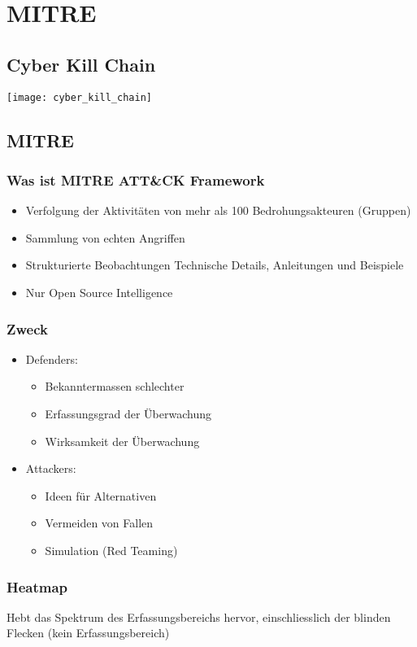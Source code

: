 

\section{MITRE}
\subsection{Cyber Kill Chain}
\begin{center}
    \texttt{[image: cyber\_kill\_chain]}
    \vspace{-8pt}
\end{center}


\subsection{MITRE}
\subsubsection{Was ist MITRE ATT\&CK Framework}
\begin{itemize}
    \item Verfolgung der Aktivitäten von mehr als 100 Bedrohungsakteuren (Gruppen)
    \item Sammlung von echten Angriffen
    \item Strukturierte Beobachtungen Technische Details, Anleitungen und Beispiele
    \item Nur Open Source Intelligence
\end{itemize}

\subsubsection{Zweck}
\begin{itemize}
    \item Defenders:
    \begin{itemize}
        \item Bekanntermassen schlechter
        \item Erfassungsgrad der Überwachung
        \item Wirksamkeit der Überwachung
    \end{itemize}
    \item Attackers:
    \begin{itemize}
        \item Ideen für Alternativen
        \item Vermeiden von Fallen
        \item Simulation (Red Teaming)
    \end{itemize}
\end{itemize}

\subsubsection{Heatmap}
Hebt das Spektrum des Erfassungsbereichs hervor, einschliesslich der blinden Flecken (kein Erfassungsbereich)